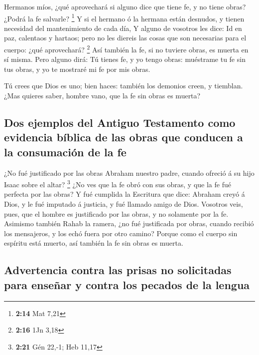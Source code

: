  Hermanos míos, ¿qué aprovechará si alguno dice que tiene
fe, y no tiene obras? ¿Podrá la fe salvarle? \footnote{\textbf{2:14} Mat
  7,21}  Y si el hermano ó la hermana están desnudos, y
tienen necesidad del mantenimiento de cada día,  Y alguno
de vosotros les dice: Id en paz, calentaos y hartaos; pero no les
diereis las cosas que son necesarias para el cuerpo: ¿qué aprovechará?
\footnote{\textbf{2:16} 1Jn 3,18}  Así también la fe, si
no tuviere obras, es muerta en sí misma.  Pero alguno
dirá: Tú tienes fe, y yo tengo obras: muéstrame tu fe sin tus obras, y
yo te mostraré mi fe por mis obras.

 Tú crees que Dios es uno; bien haces: también los
demonios creen, y tiemblan.  ¿Mas quieres saber, hombre
vano, que la fe sin obras es muerta?

\hypertarget{dos-ejemplos-del-antiguo-testamento-como-evidencia-buxedblica-de-las-obras-que-conducen-a-la-consumaciuxf3n-de-la-fe}{%
\subsection{Dos ejemplos del Antiguo Testamento como evidencia bíblica
de las obras que conducen a la consumación de la
fe}\label{dos-ejemplos-del-antiguo-testamento-como-evidencia-buxedblica-de-las-obras-que-conducen-a-la-consumaciuxf3n-de-la-fe}}

 ¿No fué justificado por las obras Abraham nuestro padre,
cuando ofreció á su hijo Isaac sobre el altar? \footnote{\textbf{2:21}
  Gén 22,-1; Heb 11,17}  ¿No ves que la fe obró con sus
obras, y que la fe fué perfecta por las obras?  Y fué
cumplida la Escritura que dice: Abraham creyó á Dios, y le fué imputado
á justicia, y fué llamado amigo de Dios.  Vosotros veis,
pues, que el hombre es justificado por las obras, y no solamente por la
fe.  Asimismo también Rahab la ramera, ¿no fué
justificada por obras, cuando recibió los mensajeros, y los echó fuera
por otro camino?  Porque como el cuerpo sin espíritu está
muerto, así también la fe sin obras es muerta.

\hypertarget{advertencia-contra-las-prisas-no-solicitadas-para-enseuxf1ar-y-contra-los-pecados-de-la-lengua}{%
\subsection{Advertencia contra las prisas no solicitadas para enseñar y
contra los pecados de la
lengua}\label{advertencia-contra-las-prisas-no-solicitadas-para-enseuxf1ar-y-contra-los-pecados-de-la-lengua}}

